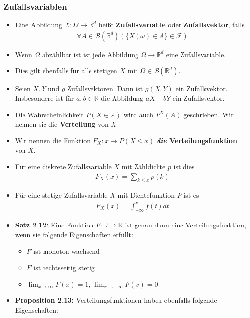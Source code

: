 \documentclass{scrartcl}
\newcommand{\borel}{\mc{B}(\mathbb{R}^d)}
\newcommand{\mc}[1]{\mathcal{#1}}
\newcommand{\real}{\mathbb{R}}
\begin{document}
\subsubsection*{Zufallsvariablen}
\begin{itemize}
    \item Eine Abbildung $X: \Omega \to \mathbb{R}^d$ heißt \textbf{Zufallsvariable} oder \textbf{Zufallsvektor}, falls
    \begin{align*}
        \forall A \in \borel (\{X(\omega) \in A\} \in \mc{F})
    \end{align*}
    \item Wenn $\Omega$ abzählbar ist ist jede Abbildung $\Omega \to \mathbb{R}^d$ eine Zufallsvariable.
    \item Dies gilt ebenfalls für alle stetigen $X$ mit $\Omega \in \borel$.
    \item Seien $X,Y$ und $g$ Zufallsvektoren. Dann ist $g(X,Y)$ ein Zufallsvektor. Insbesondere ist für $a,b \in \real$ die Abbildung $aX + bY$ ein Zufallsvektor.
    \item Die Wahrscheinlichkeit $P(X \in A)$ wird auch $P^X(A)$ geschrieben. Wir nennen sie die \textbf{Verteilung} von $X$
    \item Wir nennen die Funktion $F_X: x \to P(X \leq x)$ \textbf{\textit{die} Verteilungsfunktion} von $X$.
    \item Für eine diskrete Zufallsvariable $X$ mit Zähldichte $p$ ist dies
    \begin{align*}
        F_X(x) = \sum_{k \leq x} p(k)
    \end{align*}
    \item Für eine stetige Zufallsvariable $X$ mit Dichtefunktion $P$ ist es
    \begin{align*}
        F_X(x) = \int_{-\infty}^{x}f(t)dt
    \end{align*}
    \item \textbf{Satz 2.12:} Eine Funktion $F: \mathbb{R} \to \mathbb{R}$ ist genau dann eine Verteilungsfunktion, wenn sie folgende Eigenschaften erfüllt:
    \begin{itemize}
        \item $F$ ist monoton wachsend
        \item $F$ ist rechtsseitig stetig
        \item $\lim_{x \to \infty}F(x) = 1$, $\lim_{x \to -\infty}F(x) = 0$
    \end{itemize}
    \item \textbf{Proposition 2.13:} Verteilungsfunktionen haben ebenfalls folgende Eigenschaften:

\end{itemize}
\end{document}

